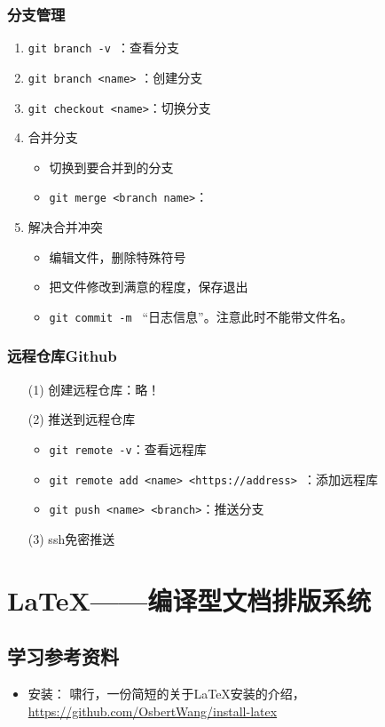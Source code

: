 \subsection{分支管理}
\begin{enumerate}
\item \verb|git branch -v |：查看分支
\item \verb|git branch <name>| ：创建分支
\item \verb|git checkout <name>|：切换分支
\item 合并分支
\begin{itemize}
\item 切换到要合并到的分支
\item \verb|git merge <branch name>|：
\end{itemize}
\item 解决合并冲突
\begin{itemize}
\item  编辑文件，删除特殊符号
\item 把文件修改到满意的程度，保存退出
\item \verb|git commit -m | ``日志信息''。注意此时不能带文件名。
\end{itemize}
\end{enumerate}



\subsection{远程仓库Github}
\begin{itemize}
\item[(1)] 创建远程仓库：略！

\item[(2)] 推送到远程仓库
\begin{itemize}
\item \verb|git remote -v|：查看远程库
\item \verb|git remote add <name> <https://address> |：添加远程库
\item \verb|git push <name> <branch>|：推送分支
\end{itemize}

\item [(3)] ssh免密推送
\end{itemize}


\chapter{\LaTeX{}——编译型文档排版系统}
\section{学习参考资料}
\begin{itemize}
\item 安装： 啸行，一份简短的关于\LaTeX{}安装的介绍，\url{https://github.com/OsbertWang/install-latex}
\end{itemize}


